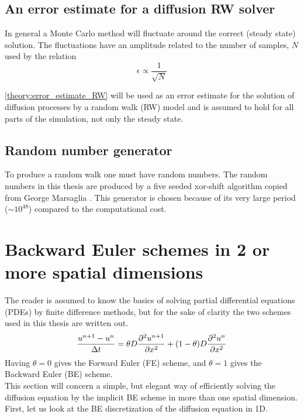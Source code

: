 \subsection{An error estimate for a diffusion RW solver}

In general a Monte Carlo method will fluctuate around the correct (steady state) solution. The fluctuations have an amplitude related to the number of samples, $N$ used by the relation
\begin{equation}\label{theory:error_estimate_RW}
 \epsilon \propto \frac{1}{\sqrt N}
\end{equation}

\noindent \eqref{theory:error_estimate_RW} will be used as an error estimate for the solution of diffusion processes by a random walk (RW) model and is assumed to hold for all parts of the simulation, not only the steady state.

\subsection{Random number generator}

To produce a random walk one must have random numbers. 
The random numbers in this thesis are produced by a five seeded xor-shift algorithm copied from George Marsaglia \cite{marsaglia2003xorshift}. 
This generator is chosen because of its very large period ($\sim10^{48}$) compared to the computational cost.

\section{Backward Euler schemes in 2 or more spatial dimensions}

The reader is assumed to know the basics of solving partial differential equations (PDEs) by finite difference methods, but for the sake of clarity the two schemes used in this thesis are written out. 
\begin{equation}\label{theory_theta_rule}
 \frac{u^{n+1}-u^n}{\Delta t} = \theta D\frac{\partial^2 u^{n+1}}{\partial x^2} + (1-\theta)D\frac{\partial^2 u^{n}}{\partial x^2}
\end{equation}
\noindent Having $\theta = 0$ gives the Forward Euler (FE) scheme, and $\theta = 1$ gives the  Backward Euler (BE) scheme. \\
This section will concern a simple, but elegant way of efficiently solving the diffusion equation by the implicit BE scheme in more than one spatial dimension. 
First, let us look at the BE discretization of the diffusion equation in 1D. 

